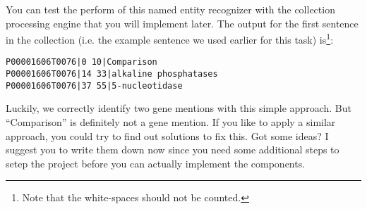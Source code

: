 \small

\normalsize

You can test the perform of this named entity recognizer with the collection
processing engine that you will implement later. The output for the first
sentence in the collection (i.e. the example sentence we used earlier for this
task) is\footnote{Note that the white-spaces should not be counted.}:

\begin{verbatim}
P00001606T0076|0 10|Comparison
P00001606T0076|14 33|alkaline phosphatases
P00001606T0076|37 55|5-nucleotidase
\end{verbatim}

Luckily, we correctly identify two gene mentions with this simple approach. But
``Comparison'' is definitely not a gene mention. If you like to apply a similar
approach, you could try to find out solutions to fix this. Got some ideas? I
suggest you to write them down now since you need some additional steps to setep
the project before you can actually implement the components.
